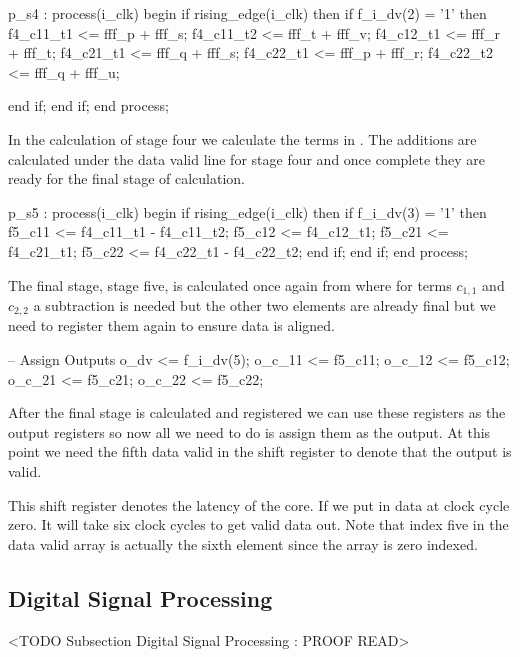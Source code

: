 \begin{VHDLlisting}[tabsize]
p_s4 : process(i_clk)
begin
	if rising_edge(i_clk) then
		if f_i_dv(2) = '1' then
			f4_c11_t1 <= fff_p + fff_s;
		    f4_c11_t2 <= fff_t + fff_v;
		    f4_c12_t1 <= fff_r + fff_t;
		    f4_c21_t1 <= fff_q + fff_s;
		    f4_c22_t1 <= fff_p + fff_r;
		    f4_c22_t2 <= fff_q + fff_u;
		
		end if;
	end if;
end process;
\end{VHDLlisting}

In the calculation of stage four we calculate the terms in . The additions are calculated under the data valid line for stage four and once complete they are ready for the final stage of calculation. 

\begin{VHDLlisting}[tabsize=2]
p_s5 : process(i_clk)
begin
	if rising_edge(i_clk) then
		if f_i_dv(3) = '1' then
			f5_c11 <= f4_c11_t1 - f4_c11_t2;
		    f5_c12 <= f4_c12_t1;
		    f5_c21 <= f4_c21_t1;
		    f5_c22 <= f4_c22_t1 - f4_c22_t2;
		end if;
	end if;
end process;
\end{VHDLlisting} 

The final stage, stage five, is calculated once again from  where for terms $c_{1,1}$ and $c_{2,2}$ a subtraction is needed but the other two elements are already final but we need to register them again to ensure data is aligned. 

\begin{VHDLlisting}[tabsize=2]
-- Assign Outputs
o_dv   <= f_i_dv(5);
o_c_11 <= f5_c11;
o_c_12 <= f5_c12;
o_c_21 <= f5_c21;
o_c_22 <= f5_c22;
\end{VHDLlisting}

After the final stage is calculated and registered we can use these registers as the output registers so now all we need to do is assign them as the output. At this point we need the fifth data valid in the shift register to denote that the output is valid. 

This shift register denotes the latency of the core. If we put in data at clock cycle zero. It will take six clock cycles to get valid data out. Note that index five in the data valid array is actually the sixth element since the array is zero indexed. 

\subsection{Digital Signal Processing}
	<TODO Subsection Digital Signal Processing : PROOF READ>
	
